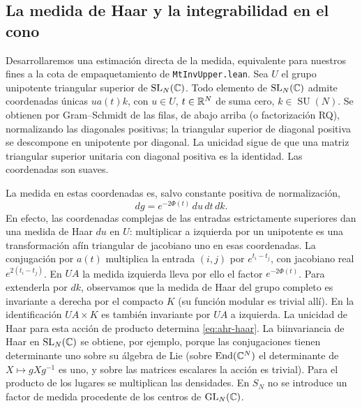 \subsection{La medida de Haar y la integrabilidad en el cono}

Desarrollaremos una estimación directa de la medida, equivalente para nuestros fines a la cota de empaquetamiento de \texttt{MtInvUpper.lean}. Sea $U$ el grupo unipotente triangular superior de $\operatorname{SL}_N(\mathbb{C})$. Todo elemento de $\operatorname{SL}_N(\mathbb{C})$ admite coordenadas únicas $u a(t)k$, con $u\in U$, $t\in\mathbb{R}^N$ de suma cero, $k\in\operatorname{SU}(N)$. Se obtienen por Gram--Schmidt de las filas, de abajo arriba (o factorización RQ), normalizando las diagonales positivas; la triangular superior de diagonal positiva se descompone en unipotente por diagonal. La unicidad sigue de que una matriz triangular superior unitaria con diagonal positiva es la identidad. Las coordenadas son suaves.

La medida en estas coordenadas es, salvo constante positiva de normalización,
\begin{equation}
 dg=e^{-2\Phi(t)}\,du\,dt\,dk.
 \label{eq:ahr-haar}
\end{equation}
En efecto, las coordenadas complejas de las entradas estrictamente superiores dan una medida de Haar $du$ en $U$: multiplicar a izquierda por un unipotente es una transformación afín triangular de jacobiano uno en esas coordenadas. La conjugación por $a(t)$ multiplica la entrada $(i,j)$ por $e^{t_i-t_j}$, con jacobiano real $e^{2(t_i-t_j)}$. En $UA$ la medida izquierda lleva por ello el factor $e^{-2\Phi(t)}$. Para extenderla por $dk$, observamos que la medida de Haar del grupo completo es invariante a derecha por el compacto $K$ (su función modular es trivial allí). En la identificación $UA\times K$ es también invariante por $UA$ a izquierda. La unicidad de Haar para esta acción de producto determina \eqref{eq:ahr-haar}. La biinvariancia de Haar en $\operatorname{SL}_N(\mathbb{C})$ se obtiene, por ejemplo, porque las conjugaciones tienen determinante uno sobre su álgebra de Lie (sobre $\operatorname{End}(\mathbb{C}^N)$ el determinante de $X\mapsto gXg^{-1}$ es uno, y sobre las matrices escalares la acción es trivial). Para el producto de los lugares se multiplican las densidades. En $S_N$ no se introduce un factor de medida procedente de los centros de $\operatorname{GL}_N(\mathbb{C})$.

